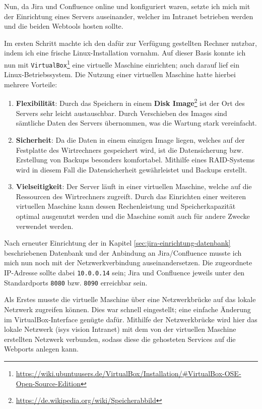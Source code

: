Nun, da Jira und Confluence online und konfiguriert waren, setzte ich mich mit der
Einrichtung eines Servers auseinander, welcher im Intranet betrieben werden und
die beiden Webtools hosten sollte.

Im ersten Schritt machte ich den dafür zur Verfügung gestellten Rechner nutzbar,
indem ich eine frische Linux-Installation vornahm. Auf dieser Basis konnte ich nun
mit \texttt{VirtualBox}\footnote{\url{https://wiki.ubuntuusers.de/VirtualBox/Installation/\#VirtualBox-OSE-Open-Source-Edition}}
eine virtuelle Maschine einrichten; auch darauf lief ein Linux-Betriebssystem. Die
Nutzung einer virtuellen Maschine hatte hierbei mehrere Vorteile:

\begin{enumerate}
	\item \textbf{Flexibilität}:
	Durch das Speichern in einem \textbf{Disk Image}\footnote{\url{https://de.wikipedia.org/wiki/Speicherabbild}} ist der Ort des Servers
	sehr leicht austauschbar. Durch Verschieben des Images sind sämtliche Daten des
	Servers übernommen, was die Wartung stark vereinfacht.
	\item \textbf{Sicherheit}:
	Da die Daten in einem einzigen Image liegen, welches auf der Festplatte des
	Wirtrechners gespeichert wird, ist die Datensicherung bzw. Erstellung von Backups
	besonders komfortabel. Mithilfe eines RAID-Systems wird in diesem Fall die Datensicherheit
	gewährleistet und Backups erstellt.
	\item \textbf{Vielseitigkeit}:
	Der Server läuft in einer virtuellen Maschine, welche auf die Ressourcen
	des Wirtrechners zugreift. Durch das Einrichten einer weiteren virtuellen Maschine
	kann dessen Rechenleistung und Speicherkapazität optimal ausgenutzt werden und
	die Maschine somit auch für andere Zwecke verwendet werden.
\end{enumerate}

Nach erneuter Einrichtung der in Kapitel \ref{sec:jira-einrichtung-datenbank} beschriebenen
Datenbank und der Anbindung an Jira/Confluence musste ich mich nun noch mit der
Netzwerkverbindung auseinandersetzen. Die zugeordnete IP-Adresse sollte dabei
\texttt{10.0.0.14} sein; Jira und Confluence jeweils unter den Standardports
\texttt{8080} bzw. \texttt{8090} erreichbar sein.

Als Erstes musste die virtuelle Maschine über eine Netzwerkbrücke auf das lokale
Netzwerk zugreifen können. Dies war schnell eingestellt; eine einfache Änderung
im VirtualBox-Interface genügte dafür. Mithilfe der Netzwerkbrücke wird hier das
lokale Netzwerk (isys vision Intranet) mit dem von der virtuellen Maschine erstellten
Netzwerk verbunden, sodass diese die gehosteten Services auf die Webports anlegen
kann.

